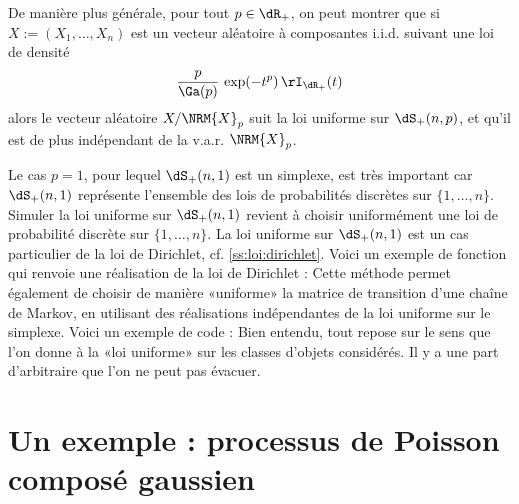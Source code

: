 De manière plus générale, pour tout $p\in\dR_+$, on peut montrer que si
$X:=(X_1,\ldots,X_n)$ est un vecteur aléatoire à composantes i.i.d. suivant
une loi de densité
$$
\frac{p}{\Ga(p)}\,\exp(-t^p)\,\rI_{\dR_+}(t)
$$
alors le vecteur aléatoire $X/\NRM{X}_p$ suit la loi uniforme sur
$\dS_+(n,p)$, et qu'il est de plus indépendant de la v.a.r. $\NRM{X}_p$.

Le cas $p=1$, pour lequel $\dS_+(n,1)$ est un simplexe, est très important car
$\dS_+(n,1)$ représente l'ensemble des lois de probabilités discrètes sur
$\{1,\ldots,n\}$. Simuler la loi uniforme sur $\dS_+(n,1)$ revient à choisir
uniformément une loi de probabilité discrète sur $\{1,\ldots,n\}$.  La loi
uniforme sur $\dS_+(n,1)$ est un cas particulier de la loi de Dirichlet, cf.
\ref{ss:loi:dirichlet}. Voici un exemple de fonction \ML{} qui renvoie une
réalisation de la loi de Dirichlet :
%
%
Cette méthode permet également de choisir de manière «uniforme» la matrice de
transition d'une chaîne de Markov, en utilisant des réalisations indépendantes
de la loi uniforme sur le simplexe. Voici un exemple de code \ML{} :
%
%
Bien entendu, tout repose sur le sens que l'on donne à la «loi uniforme» sur
les classes d'objets considérés. Il y a une part d'arbitraire que l'on ne peut
pas évacuer.

%
\section{Un exemple : processus de Poisson composé gaussien}
%

